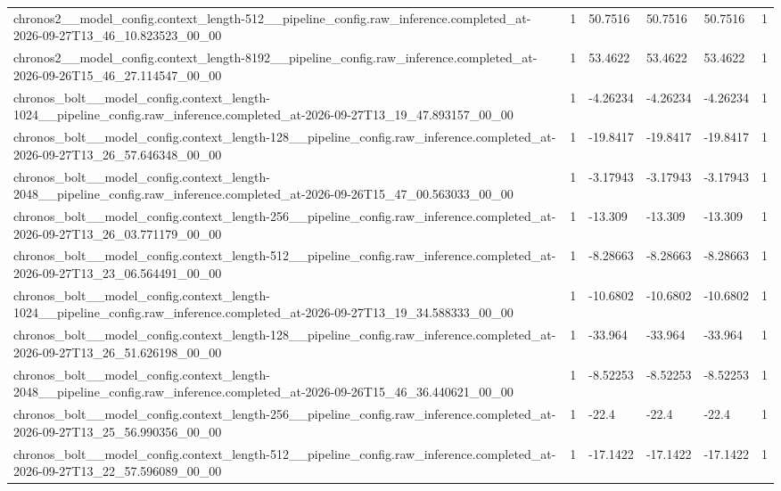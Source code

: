 \begin{tabular}{llllll}
chronos2\_\_model\_config.context\_length-512\_\_pipeline\_config.raw\_inference.completed\_at-2026-09-27T13\_46\_10.823523\_00\_00 & 1 & 50.7516 & 50.7516 & 50.7516 & 1 \\
chronos2\_\_model\_config.context\_length-8192\_\_pipeline\_config.raw\_inference.completed\_at-2026-09-26T15\_46\_27.114547\_00\_00 & 1 & 53.4622 & 53.4622 & 53.4622 & 1 \\
chronos\_bolt\_\_model\_config.context\_length-1024\_\_pipeline\_config.raw\_inference.completed\_at-2026-09-27T13\_19\_47.893157\_00\_00 & 1 & -4.26234 & -4.26234 & -4.26234 & 1 \\
chronos\_bolt\_\_model\_config.context\_length-128\_\_pipeline\_config.raw\_inference.completed\_at-2026-09-27T13\_26\_57.646348\_00\_00 & 1 & -19.8417 & -19.8417 & -19.8417 & 1 \\
chronos\_bolt\_\_model\_config.context\_length-2048\_\_pipeline\_config.raw\_inference.completed\_at-2026-09-26T15\_47\_00.563033\_00\_00 & 1 & -3.17943 & -3.17943 & -3.17943 & 1 \\
chronos\_bolt\_\_model\_config.context\_length-256\_\_pipeline\_config.raw\_inference.completed\_at-2026-09-27T13\_26\_03.771179\_00\_00 & 1 & -13.309 & -13.309 & -13.309 & 1 \\
chronos\_bolt\_\_model\_config.context\_length-512\_\_pipeline\_config.raw\_inference.completed\_at-2026-09-27T13\_23\_06.564491\_00\_00 & 1 & -8.28663 & -8.28663 & -8.28663 & 1 \\
chronos\_bolt\_\_model\_config.context\_length-1024\_\_pipeline\_config.raw\_inference.completed\_at-2026-09-27T13\_19\_34.588333\_00\_00 & 1 & -10.6802 & -10.6802 & -10.6802 & 1 \\
chronos\_bolt\_\_model\_config.context\_length-128\_\_pipeline\_config.raw\_inference.completed\_at-2026-09-27T13\_26\_51.626198\_00\_00 & 1 & -33.964 & -33.964 & -33.964 & 1 \\
chronos\_bolt\_\_model\_config.context\_length-2048\_\_pipeline\_config.raw\_inference.completed\_at-2026-09-26T15\_46\_36.440621\_00\_00 & 1 & -8.52253 & -8.52253 & -8.52253 & 1 \\
chronos\_bolt\_\_model\_config.context\_length-256\_\_pipeline\_config.raw\_inference.completed\_at-2026-09-27T13\_25\_56.990356\_00\_00 & 1 & -22.4 & -22.4 & -22.4 & 1 \\
chronos\_bolt\_\_model\_config.context\_length-512\_\_pipeline\_config.raw\_inference.completed\_at-2026-09-27T13\_22\_57.596089\_00\_00 & 1 & -17.1422 & -17.1422 & -17.1422 & 1 \\

\end{tabular}
